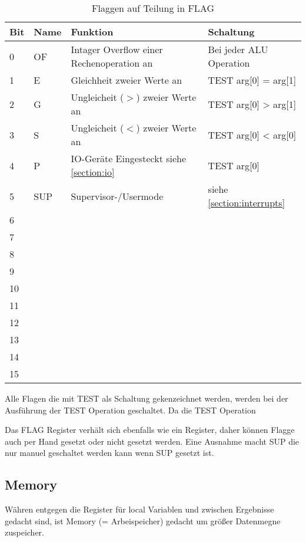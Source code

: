 \documentclass{scrartcl}
\begin{document}
\begin{center}
	\begin{table}[h]
		\caption{\label{table:flag}Flaggen auf Teilung in FLAG}
		\begin{tabular}{l | l | l | l}
			Bit & Name & Funktion & Schaltung \\
			\hline
			 0 & OF  & Intager Overflow einer Rechenoperation an & Bei jeder ALU Operation\\
			 1 & E   & Gleichheit zweier Werte an & TEST arg[0] = arg[1]\\
			 2 & G   & Ungleicheit ($>$) zweier Werte an & TEST arg[0] > arg[1]\\
			 3 & S   & Ungleicheit ($<$) zweier Werte an & TEST arg[0] < arg[0]\\
			 4 & P   & IO-Geräte Eingesteckt siehe \autoref{section:io} & TEST arg[0]\\
			 5 & SUP & Supervisor-/Usermode & siehe \autoref{section:interrupts} \\
			 6 &  &  &  \\
			 7 &  &  &  \\
			 8 &  &  &  \\
			 9 &  &  &  \\
			10 &  &  &  \\
			11 &  &  &  \\
			12 &  &  &  \\
			13 &  &  &  \\
			14 &  &  &  \\
			15 &  &  & 
		\end{tabular}
	\end{table}
\end{center}

Alle Flagen die mit TEST als Schaltung gekenzeichnet werden, werden bei der Ausführung der TEST Operation geschaltet. Da die TEST Operation 

Das FLAG Register verhält sich ebenfalls wie ein Register, daher können Flagge auch per Hand gesetzt oder nicht gesetzt werden. Eine Ausnahme macht SUP die nur manuel geschaltet werden kann wenn SUP gesetzt ist.

\subsection{\label{section:memory}Memory}

Währen entgegen die Register für local Variablen und zwischen Ergebnisse gedacht sind, ist Memory (= Arbeispeicher) gedacht um größer Datenmegne zuspeicher.
\end{document}
